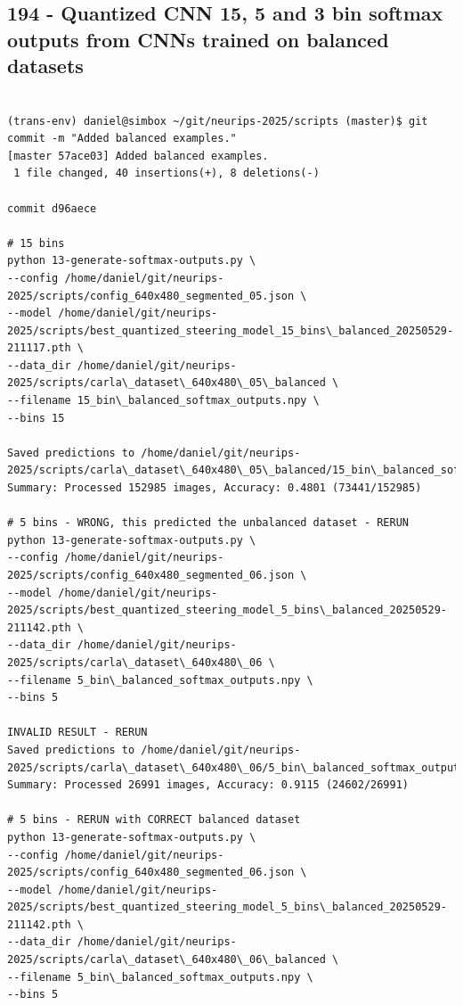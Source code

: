 \subsection{194 - Quantized CNN 15, 5 and 3 bin softmax outputs from CNNs trained on balanced datasets}
\label{app_res:194}


\begin{verbatim}

(trans-env) daniel@simbox ~/git/neurips-2025/scripts (master)$ git commit -m "Added balanced examples."
[master 57ace03] Added balanced examples.
 1 file changed, 40 insertions(+), 8 deletions(-)

commit d96aece

# 15 bins
python 13-generate-softmax-outputs.py \
--config /home/daniel/git/neurips-2025/scripts/config_640x480_segmented_05.json \
--model /home/daniel/git/neurips-2025/scripts/best_quantized_steering_model_15_bins\_balanced_20250529-211117.pth \
--data_dir /home/daniel/git/neurips-2025/scripts/carla\_dataset\_640x480\_05\_balanced \
--filename 15_bin\_balanced_softmax_outputs.npy \
--bins 15 

Saved predictions to /home/daniel/git/neurips-2025/scripts/carla\_dataset\_640x480\_05\_balanced/15_bin\_balanced_softmax_outputs.npy
Summary: Processed 152985 images, Accuracy: 0.4801 (73441/152985)

# 5 bins - WRONG, this predicted the unbalanced dataset - RERUN
python 13-generate-softmax-outputs.py \
--config /home/daniel/git/neurips-2025/scripts/config_640x480_segmented_06.json \
--model /home/daniel/git/neurips-2025/scripts/best_quantized_steering_model_5_bins\_balanced_20250529-211142.pth \
--data_dir /home/daniel/git/neurips-2025/scripts/carla\_dataset\_640x480\_06 \
--filename 5_bin\_balanced_softmax_outputs.npy \
--bins 5 

INVALID RESULT - RERUN 
Saved predictions to /home/daniel/git/neurips-2025/scripts/carla\_dataset\_640x480\_06/5_bin\_balanced_softmax_outputs.npy
Summary: Processed 26991 images, Accuracy: 0.9115 (24602/26991)

# 5 bins - RERUN with CORRECT balanced dataset
python 13-generate-softmax-outputs.py \
--config /home/daniel/git/neurips-2025/scripts/config_640x480_segmented_06.json \
--model /home/daniel/git/neurips-2025/scripts/best_quantized_steering_model_5_bins\_balanced_20250529-211142.pth \
--data_dir /home/daniel/git/neurips-2025/scripts/carla\_dataset\_640x480\_06\_balanced \
--filename 5_bin\_balanced_softmax_outputs.npy \
--bins 5


\end{verbatim}
